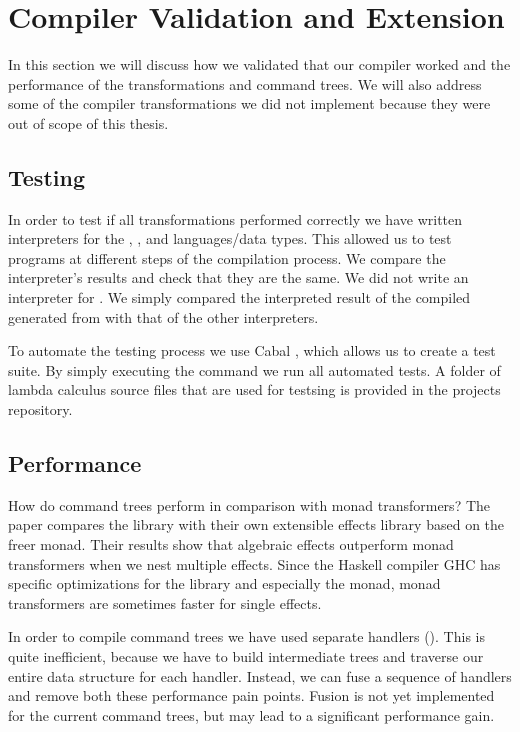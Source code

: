 \chapter{\label{chap:compiler}Compiler Validation and Extension}
In this section we will discuss how we validated that our compiler worked and the performance of the transformations and command trees. We will also address some of the compiler transformations we did not implement because they were out of scope of this thesis.

\section{Testing}
In order to test if all transformations performed correctly we have written interpreters for the , , and  languages/data types. This allowed us to test programs at different steps of the compilation process. We compare the interpreter's results and check that they are the same. We did not write an interpreter for . We simply compared the interpreted result of the compiled  generated from  with that of the other interpreters.

To automate the testing process we use Cabal \autocite{haskellcabal}, which allows us to create a test suite. By simply executing the  command we run all automated tests. A folder of lambda calculus source files that are used for testsing is provided in the projects repository.

\section{Performance}
How do command trees perform in comparison with monad transformers? The paper  \autocite{DBLP:conf/haskell/KiselyovI15} compares the  library with their own extensible effects library based on the freer monad. Their results show that algebraic effects outperform monad transformers when we nest multiple effects. Since the Haskell compiler GHC has specific optimizations for the  library and especially the  monad, monad transformers are sometimes faster for single effects.

In order to compile command trees we have used separate handlers (). This is quite inefficient, because we have to build intermediate trees and traverse our entire data structure for each handler. Instead, we can fuse \autocite{DBLP:conf/mpc/WuS15} a sequence of handlers and remove both these performance pain points. Fusion is not yet implemented for the current command trees, but may lead to a significant performance gain.

